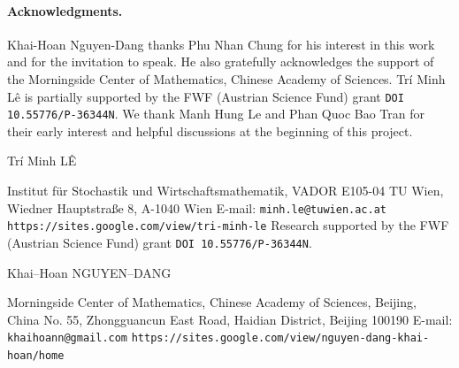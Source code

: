 \documentclass[11pt]{article}
\theoremstyle{definition}
\numberwithin{equation}{section}
\begin{document}
\paragraph{Acknowledgments.}
Khai-Hoan Nguyen-Dang thanks Phu Nhan Chung for his interest in this work and for the invitation to speak.
He also gratefully acknowledges the support of the Morningside Center of Mathematics, Chinese Academy of Sciences.
Tr\'i Minh L\^e is partially supported by the FWF (Austrian Science Fund) grant \texttt{DOI 10.55776/P-36344N}.
We thank Manh Hung Le and Phan Quoc Bao Tran for their early interest and helpful discussions at the beginning of this project.

\nocite{*}





\noindent Tr\'i Minh L\^E

\medskip

\noindent Institut f\"{u}r Stochastik und Wirtschaftsmathematik, VADOR E105-04
\newline TU Wien, Wiedner Hauptstra{\ss }e 8, A-1040 Wien\medskip
\newline\noindent E-mail: \texttt{minh.le@tuwien.ac.at}
\newline\noindent\texttt{https://sites.google.com/view/tri-minh-le} \smallskip\newline
\noindent Research supported by the FWF (Austrian Science Fund) grant \texttt{DOI 10.55776/P-36344N}.

\bigskip

\noindent Khai--Hoan NGUYEN--DANG

\medskip

\noindent Morningside Center of Mathematics, Chinese Academy of Sciences, Beijing, China
\newline No. 55, Zhongguancun East Road, Haidian District, Beijing 100190 \medskip
\newline\noindent E-mail: \texttt{khaihoann@gmail.com}
\newline\noindent\texttt{https://sites.google.com/view/nguyen-dang-khai-hoan/home} \smallskip\newline
\noindent
\end{document}
